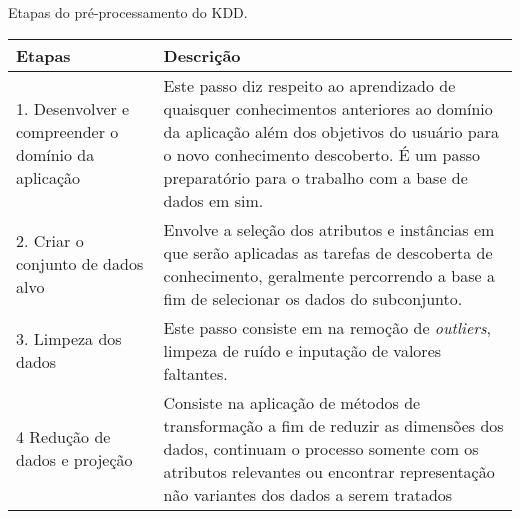 \begin{quadro}[!htb]
    \centering
    \caption{Etapas do pré-processamento do KDD.\label{qua:etapasPreProcKDD}}
    \begin{tabular}{|p{7cm}|p{7cm}|}
        \hline
        \textbf{Etapas} & \textbf{Descrição} \\
        \hline
        1. Desenvolver e compreender o domínio da aplicação & Este passo diz respeito ao aprendizado de quaisquer conhecimentos anteriores ao domínio da aplicação além dos objetivos do usuário para o novo conhecimento descoberto. É um passo preparatório para o trabalho com a base de dados em sim. \\ \hline
        2. Criar o conjunto de dados alvo & Envolve a seleção dos atributos e instâncias em que serão aplicadas as tarefas de descoberta de conhecimento, geralmente percorrendo a base a fim de selecionar os dados do subconjunto. \\ \hline
        3. Limpeza dos dados & Este passo consiste em na remoção de \textit{outliers}, limpeza de ruído e inputação de valores faltantes. \\ \hline
        4 Redução de dados e projeção & Consiste na aplicação de métodos de transformação a fim de reduzir as dimensões dos dados, continuam o processo somente com os atributos relevantes ou encontrar representação não variantes dos dados a serem tratados\\
        \hline
    \end{tabular}
\end{quadro}